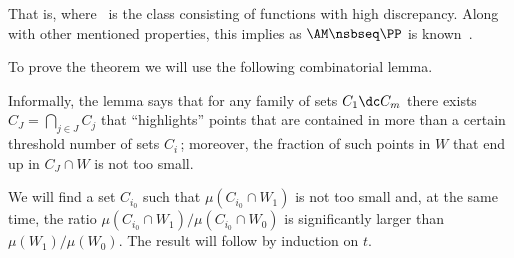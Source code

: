 
That is,
\mal{
\SLAM ~ \sbseq ~ \PP
\,,}
where \PP\ is the class consisting of functions with high discrepancy.
Along with other mentioned properties, this implies
as $\AM\nsbseq\PP$ is known~\cite{K11_On}.


To prove the theorem we will use the following combinatorial lemma.


Informally, the lemma says that for any family of sets $C_1\dc C_m$ there exists
%
$C_J=\bigcap_{j\in J}C_j$  %
that ``highlights'' points that are contained in more than a certain threshold number of %
sets $C_i$\,;  %
moreover, the fraction of such points in $W$ that end up in $C_J \cap W$ is not too small.

We will find %
a set $C_{i_0}$ such  %
that $\mu(C_{i_0} \cap W_1)$ is not too small and, at the same time,
the ratio %
${\mu(C_{i_0} \cap W_1)}/{\mu(C_{i_0} \cap W_0)}$ is significantly larger than ${\mu(W_1)}/{\mu(W_0)}$.
The result will follow by induction on $t$.


